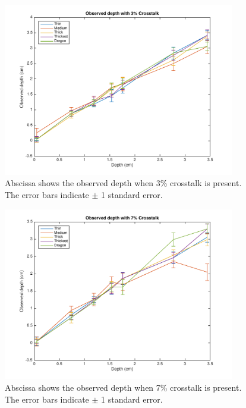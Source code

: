 \begin{figure}[H]
\centering
    \includegraphics[width=0.9\textwidth]{./Template_Figures/a_crosstalk_3}
    \caption{Abscissa shows the observed depth when 3\% crosstalk is present. The error bars indicate $\pm$ 1 standard error.\label{fig:a_crosstalk_3}}
\end{figure}

\begin{figure}[H]
\centering
    \includegraphics[width=0.9\textwidth]{./Template_Figures/a_crosstalk_7}
    \caption{Abscissa shows the observed depth when 7\% crosstalk is present. The error bars indicate $\pm$ 1 standard error.\label{fig:a_crosstalk_7}}
\end{figure}

